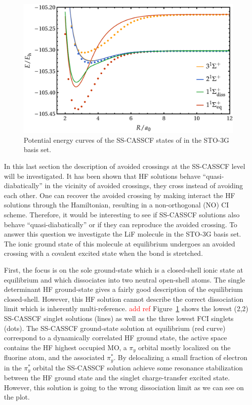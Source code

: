 \documentclass[aps,prb,reprint,showkeys,superscriptaddress]{revtex4-1}
\newcommand{\todo}[1]{\textcolor{red}{#1}}
\begin{document}
\begin{figure}
  \centering
  \includegraphics[width=0.9\linewidth]{Figures/fig_7.pdf}
  \caption{Potential energy curves of the SS-CASSCF states of  in the STO-3G basis set. \label{fig:fig_9}}
\end{figure}

In this last section the description of avoided crossings at the SS-CASSCF level will be investigated.
It has been shown that HF solutions behave ``quasi-diabatically'' in the vicinity of avoided crossings, \ie they cross instead of avoiding each other. \cite{Thom_2009}
One can recover the avoided crossing by making interact the HF solutions through the Hamiltonian, resulting in a non-orthogonal (NO) CI scheme. \cite{Burton_2019}
Therefore, it would be interesting to see if SS-CASSCF solutions also behave ``quasi-diabatically'' or if they can reproduce the avoided crossing.
To answer this question we investigate the LiF molecule in the STO-3G basis set.
The ionic ground state of this molecule at equilibrium undergoes an avoided crossing with a covalent excited state when the bond is stretched. \cite{Thom_2009,Mahler_2021}

First, the focus is on the sole ground-state which is a closed-shell ionic state at equilibrium and which dissociates into two neutral open-shell atoms.
The single determinant HF ground-state gives a fairly good description of the equilibrium closed-shell.
However, this HF solution cannot describe the correct dissociation limit which is inherently multi-reference. \todo{add ref}
Figure~\ref{fig:fig_9} shows the lowest (2,2) SS-CASSCF singlet solutions (lines) as well as the three lowest FCI singlets (dots).
The SS-CASSCF ground-state solution at equilibrium (red curve) correspond to a dynamically correlated HF ground state, \ie the active space contains the HF highest occupied MO, a $\pi_y$ orbital mostly localized on the fluorine atom, and the associated $\pi_y^*$.
By delocalizing a small fraction of electron in the $\pi_y^*$ orbital the SS-CASSCF solution achieve some resonance stabilization between the HF ground state and the singlet charge-transfer excited state.
However, this solution is going to the wrong dissociation limit as we can see on the plot.
\end{document}
